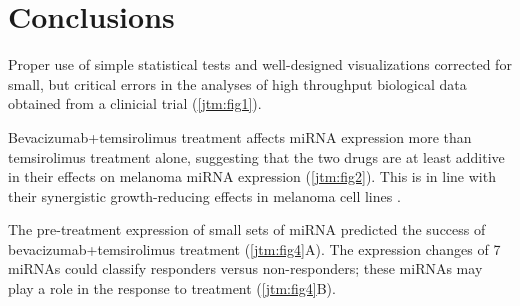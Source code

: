\section{Conclusions}

Proper use of simple statistical tests and well-designed visualizations corrected for
small, but critical errors in the analyses of high throughput biological data
obtained from a clinicial trial (\autoref{jtm:fig1}).

Bevacizumab+temsirolimus treatment affects miRNA expression more than temsirolimus treatment alone,
suggesting that the two drugs are at least additive in their effects on melanoma miRNA expression (\autoref{jtm:fig2}).
This is in line with their synergistic growth-reducing effects in melanoma cell lines \cite{Molhoek:2008jx}.

The pre-treatment expression of small sets of miRNA
predicted the success of bevacizumab+temsirolimus treatment (\autoref{jtm:fig4}A). 
The expression changes of 7 miRNAs could classify responders versus non-responders; these
miRNAs may play a role in the response to treatment (\autoref{jtm:fig4}B).






